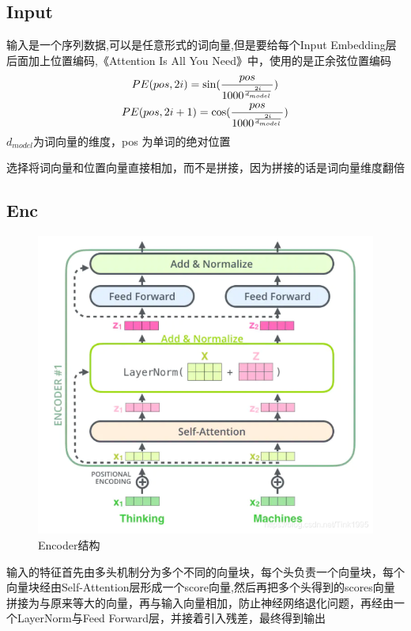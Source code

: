 \documentclass{article}
\begin{document}
\begin{sloppypar}
      \subsection{Input}
      输入是一个序列数据,可以是任意形式的词向量,但是要给每个Input Embedding层后面加上位置编码,《Attention Is All You Need》中，使用的是正余弦位置编码
      \begin{gather}
            PE(pos,2i)=\sin (\frac{pos}{1000^{\frac{2i}{d_{model}}}})\\
            \newline
            PE(pos,2i+1)=\cos (\frac{pos}{1000^{\frac{2i}{d_{model}}}})
      \end{gather}
      $d_{model}$为词向量的维度，pos 为单词的绝对位置

      选择将词向量和位置向量直接相加，而不是拼接，因为拼接的话是词向量维度翻倍


      \subsection{Enc}
      \newpage

      \begin{figure}[ht]
            \centering
            \label{enc}
            \includegraphics[scale=0.5]{enc}
            \caption{Encoder结构}
      \end{figure}
      输入的特征首先由多头机制分为多个不同的向量块，每个头负责一个向量块，每个向量块经由Self-Attention层形成一个score向量,然后再把多个头得到的scores向量拼接为与原来等大的向量，再与输入向量相加，防止神经网络退化问题，再经由一个LayerNorm与Feed Forward层，并接着引入残差，最终得到输出



\end{sloppypar}
\end{document}
